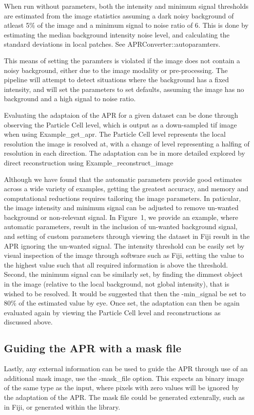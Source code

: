 \documentclass[12pt]{article}
\begin{document}
When run without parameters, both the intensity and minimum signal thresholds are estimated from the image statistics assuming a dark noisy background of atleast 5\% of the image and a minimum signal to noise ratio of 6. This is done by estimating the median background intensity noise level, and calculating the standard deviations in local patches. See APRConverter::autoparamters.

This means of setting the paramters is violated if the image does not contain a noisy background, either due to the image modality or pre-processing. The pipeline will attempt to detect situations where the background has a fixed intensity, and will set the parameters to set defaults, assuming the image has no background and a high signal to noise ratio.

Evaluating the adaptaion of the APR for a given dataset can be done through observing the Particle Cell level, which is output as a down-sampled tif image when using Example\_get\_apr. The Particle Cell level represents the local resolution the image is resolved at, with a change of level representing a halfing of resolution in each direction. The adaptation can be in more detailed explored by direct reconstruction using Example\_reconstruct\_image

Although we have found that the automatic parameters provide good estimates across a wide variety of examples, getting the greatest accuracy, and memory and computational reductions requires tailoring the image parameters. In paticular, the image intensity and minimum signal can be adjusted to remove un-wanted background or non-relevant signal. In Figure~1, we provide an example, where automatic parameters, result in the inclusion of un-wanted background signal, and setting of custom parameters through viewing the dataset in Fiji result in the APR ignoring the un-wanted signal. The intensity threshold can be easily set by visual inspection of the image through software such as Fiji, setting the value to the highest value such that all required information is above the threshold. Second, the minimum signal can be similarly set, by finding the dimmest object in the image (relative to the local background, not global intensity), that is wished to be resolved. It would be suggested that then the -min\_signal be set to 80\% of the estimated value by eye. Once set, the adaptation can then be again evaluated again by viewing the Particle Cell level and reconstructions as discussed above.
\subsection{Guiding the APR with a mask file}
Lastly, any external information can be used to guide the APR through use of an additional mask image, use the -mask\_file option. This expects an binary image of the same type as the input, where pixels with zero values will be ignored by the adaptation of the APR. The mask file could be generated extenrally, such as in Fiji, or generated within the library.
\end{document}
